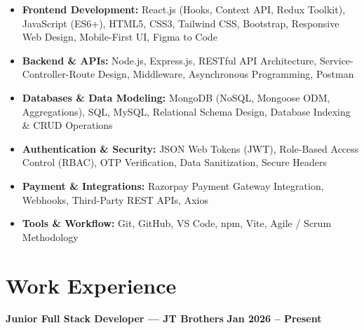\documentclass[a4paper,10pt]{article}
\begin{document}
\begin{itemize}

    \item \textbf{Frontend Development:}
    React.js (Hooks, Context API, Redux Toolkit), JavaScript (ES6+),
    HTML5, CSS3, Tailwind CSS, Bootstrap, Responsive Web Design,
    Mobile-First UI, Figma to Code

    \item \textbf{Backend \& APIs:}
    Node.js, Express.js, RESTful API Architecture, Service-Controller-Route Design,
    Middleware, Asynchronous Programming, Postman

    \item \textbf{Databases \& Data Modeling:}
    MongoDB (NoSQL, Mongoose ODM, Aggregations), SQL, MySQL,
    Relational Schema Design, Database Indexing \& CRUD Operations

    \item \textbf{Authentication \& Security:}
    JSON Web Tokens (JWT), Role-Based Access Control (RBAC),
    OTP Verification, Data Sanitization, Secure Headers

    \item \textbf{Payment \& Integrations:}
    Razorpay Payment Gateway Integration, Webhooks, Third-Party REST APIs, Axios

    \item \textbf{Tools \& Workflow:}
    Git, GitHub, VS Code, npm, Vite, Agile / Scrum Methodology

\end{itemize}

\section*{Work Experience}

\textbf{Junior Full Stack Developer --- JT Brothers}
\hfill
\textbf{Jan 2026 -- Present}
\end{document}
